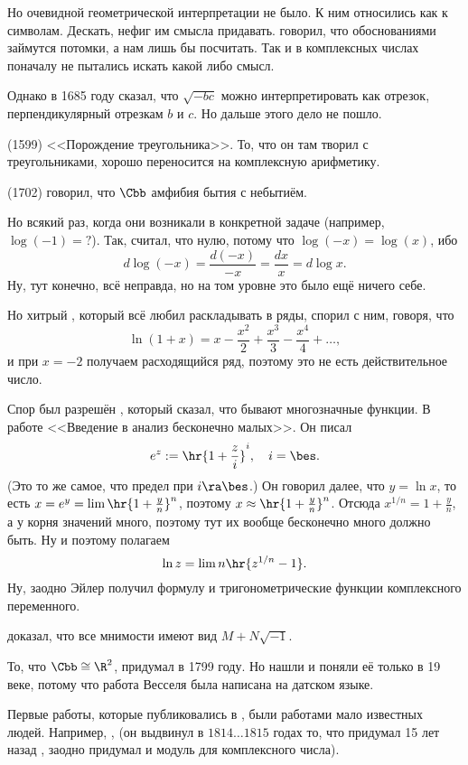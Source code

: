 \documentclass[a4paper,oneside,fleqn,10pt]{article}
\newcommand{\pe}[2]{${#1}\ldots{#2}$}
\begin{document}
Но очевидной геометрической интерпретации не было. К ним относились как к символам.
Дескать, нефиг им смысла придавать.  говорил, что обоснованиями займутся потомки,
а нам лишь бы посчитать. Так и в комплексных числах поначалу не пытались искать
какой либо смысл.

Однако  в 1685 году сказал, что $\sqrt{-bc}$ можно интерпретировать как
отрезок, перпендикулярный отрезкам $b$ и $c$. Но дальше этого дело не пошло.

 (1599) <<Порождение треугольника>>. То, что он там творил с треугольниками,
хорошо переносится на комплексную арифметику.

 (1702) говорил, что $\Cbb$ амфибия бытия с небытиём.

Но всякий раз, когда они возникали в конкретной задаче (например, $\log(-1) = ?$).
Так,  считал, что нулю, потому что $\log(-x) = \log(x)$,
ибо $$d\log(-x) = \frac{d(-x)}{-x} = \frac{dx}{x} = d\log x.$$
Ну, тут конечно, всё неправда, но на том уровне это было ещё ничего себе.

Но хитрый , который всё любил раскладывать в ряды, спорил с ним, говоря, что
$$\ln(1+x) = x - \frac{x^2}{2} + \frac{x^3}{3} - \frac{x^4}{4} + \dots,$$
и при $x = -2$ получаем расходящийся ряд, поэтому это не есть действительное число.

Спор был разрешён , который сказал, что бывают многозначные функции.
В работе <<Введение в анализ бесконечно малых>>.
Он писал
$$e^z := \hr{1 + \frac{z}{i}}^i, \quad i = \bes.$$
(Это то же самое, что предел при $i \ra \bes$.)
Он говорил далее, что $y = \ln x$, то есть $x = e^y = \lim\hr{1 + \frac{y}{n}}^n$,
поэтому $x \approx \hr{1 + \frac{y}{n}}^n$.
Отсюда $x^{1/n} = 1 + \frac{y}{n}$, а у корня значений много, поэтому тут их вообще бесконечно много
должно быть. Ну и поэтому полагаем
$$\ln z = \lim n \hr{z^{1/n} - 1}.$$
Ну, заодно Эйлер получил формулу  и тригонометрические функции комплексного переменного.

 доказал, что все мнимости имеют вид $M + N \sqrt{-1}$.

То, что $\Cbb \cong \R^2$, придумал  
в 1799 году. Но нашли и поняли её только в 19 веке, потому что работа Весселя была
написана на датском языке.

Первые работы, которые публиковались в ,
были работами мало известных людей.
Например, ,  (он выдвинул в \pe{1814}{1815} годах то, что придумал 15 лет назад ,
заодно придумал и модуль для комплексного числа).
\end{document}
